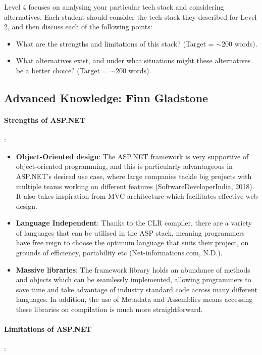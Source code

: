 \documentclass[a4paper, 11pt]{report}
\begin{document}
	Level 4 focuses on analysing your particular tech stack and considering alternatives. Each student should consider the tech stack they described for Level 2, and then discuss each of the following points:
	\begin{itemize}
		\item What are the strengths and limitations of this stack? (Target = $\sim$200 words).
		\item What alternatives exist, and under what situations might these alternatives be a better choice? (Target = $\sim$200 words).
	\end{itemize}

    \subsection{Advanced Knowledge: Finn Gladstone}

	\paragraph{Strengths of ASP.NET}:
	\begin{itemize}
	    \item \textbf{Object-Oriented design}: The ASP.NET framework is very supportive of object-oriented programming, and this is particularly advantageous in ASP.NET's desired use case, where large companies tackle big projects with multiple teams working on different features (SoftwareDeveloperIndia, 2018). It also takes inspiration from MVC architecture which facilitates effective web design.

	    \item \textbf{Language Independent}: Thanks to the CLR compiler, there are a variety of languages that can be utilised in the ASP stack, meaning programmers have free reign to choose the optimum language that suits their project, on grounds of efficiency, portability etc (Net-informations.com, N.D.).

	    \item \textbf{Massive libraries}: The framework library holds an abundance of methods and objects which can be seamlessly implemented, allowing programmers to save time and take advantage of industry standard code across many different languages. In addition, the use of Metadata and Assemblies means accessing these libraries on compilation is much more straightforward.

    \end{itemize}

	\paragraph{Limitations of ASP.NET}:
\end{document}
